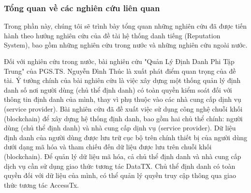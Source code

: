 \documentclass{article}[14pt]
\begin{document}
{        %
        
        \subsubsection{Tổng quan về các nghiên cứu liên quan} 
            Trong phần này, chúng tôi sẽ trình bày tổng quan những nghiên cứu đã được tiến hành theo hướng nghiên cứu của đề tài hệ thống danh tiếng (Reputation System), bao gồm những nghiên cứu trong nước và những nghiên cứu ngoài nước. 
            \par
            Đối với nghiên cứu trong nước, bài nghiên cứu "Quản Lý Định Danh Phi Tập Trung" của PGS.TS. Nguyễn Đình Thúc \cite{quan-ly-dinh-danh-phi-tap-trung} là xuất phát điểm quan trọng của đề tài. Ý tưởng chính của bài nghiên cứu là việc xây dựng một thống quản lý định danh số nơi người dùng (chủ thể định danh) có toàn quyền kiểm soát đối với thông tin định danh của mình, thay vì phụ thuộc vào các nhà cung cấp dịnh vụ (service provider). Bài nghiên cứu đã đề xuất việc sử dụng công nghệ chuỗi khối (blockchain) để xây dựng hệ thống định danh, bao gồm hai chủ thể chính: người dùng (chủ thể định danh) và nhà cung cấp dịnh vụ (service provider). Dữ liệu định danh của người dùng được lưu trữ cục bộ trên chính thiết bị của người dùng dưới dạng mã hóa và tham chiếu đến dữ liệu được lưu trên chuỗi khối (blockchain). Để quản lý dữ liệu mã hóa, cả chủ thể định danh và nhà cung cấp dịch vụ cần sử dụng giao thức tương tác DataTX. Chủ thể định danh có toàn quyền đối với dữ liệu của mình, có thể quản lý quyền truy cập thông qua giao thức tương tác AccessTx. 
            \par
}
\end{document}
